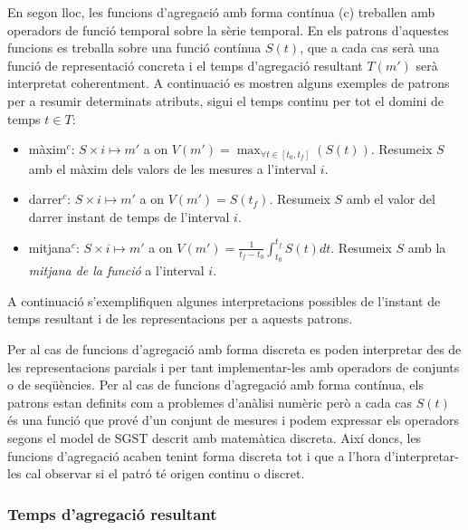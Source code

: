 En segon lloc, les funcions d'agregació amb forma contínua (c)
treballen amb operadors de funció temporal sobre la sèrie temporal.
En els patrons d'aquestes funcions es treballa sobre una funció
contínua $S(t)$, que a cada cas serà una funció de representació
concreta i el temps d'agregació resultant $T(m')$ serà interpretat
coherentment.  A continuació es mostren alguns exemples de patrons per
a resumir determinats atributs, sigui el temps continu per tot el
domini de temps $t\in T$:
\begin{itemize}
\item màxim$^c$: $S \times i \mapsto m'$ a on $V(m') = \max_{\forall t
    \in [t_0,t_f]}(S(t))$. Resumeix $S$ amb el màxim dels valors de
  les mesures a l'interval $i$.
\item darrer$^c$: $S \times i \mapsto m'$ a on $V(m') =
  S(t_f)$. Resumeix $S$ amb el valor del darrer instant de temps de
  l'interval $i$.

\item mitjana$^c$: $S \times i \mapsto m'$ a on $V(m') =
  \frac{1}{t_f-t_0} \int_{t_0}^{t_f} S(t)dt$. Resumeix $S$ amb la
  \emph{mitjana de la funció} \parencite{weisstein:averagefunction} a
  l'interval $i$.  

\end{itemize}


A continuació s'exemplifiquen algunes interpretacions possibles de
l'instant de temps resultant i de les representacions per a aquests
patrons. 

Per al cas de funcions d'agregació amb forma discreta es poden
interpretar des de les representacions parcials i per tant
implementar-les amb operadors de conjunts o de seqüències.  
Per al cas de funcions d'agregació amb forma contínua, els patrons
estan definits com a problemes d'anàlisi numèric però a cada cas
$S(t)$ és una funció que prové d'un conjunt de mesures i podem
expressar els operadors segons el model de \gls{SGST} descrit amb matemàtica
discreta. Així doncs, les funcions d'agregació acaben tenint forma
discreta tot i que a l'hora d'interpretar-les cal observar si el patró
té origen continu o discret.




\subsubsection{Temps d'agregació resultant}

